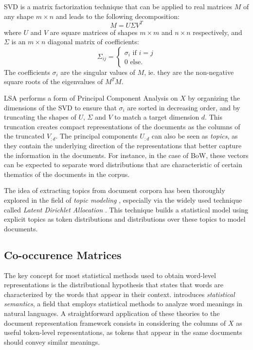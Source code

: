 SVD is a matrix factorization technique that can be applied to real matrices $M$ of any shape $m \times n$ and leads to the following decomposition:
$$
M = U \Sigma V^T
$$
where $U$ and $V$ are square matrices of shapes $m \times m$ and $n \times n$ respectively, and $\Sigma$ is an $m \times n$ diagonal matrix of coefficients:
\begin{equation*}
  \Sigma_{ij} = \begin{cases}
    \sigma_i \text{ if } i=j \\
    0 \text{ else.}
  \end{cases}
\end{equation*}
The coefficients $\sigma_i$ are the singular values of $M$, ie. they are the non-negative square roots of the eigenvalues of $M^TM$.

LSA performs a form of Principal Component Analysis on $X$ by organizing the dimensions of the SVD to ensure that $\sigma_i$ are sorted in decreasing order, and by truncating the shapes of $U$, $\Sigma$ and $V$ to match a target dimension $d$. This truncation creates compact representations of the documents as the columns of the truncated $V_{:d}$. The principal components $U_{:d}$ can also be seen as \textit{topics}, as they contain the underlying direction of the representations that better capture the information in the documents. For instance, in the case of BoW, these vectors can be expected to separate word distributions that are characteristic of certain thematics of the documents in the corpus.

The idea of extracting topics from document corpora has been thoroughly explored in the field of \textit{topic modeling} \citep{churchill2022evolution}, especially via the widely used technique called \textit{Latent Dirichlet Allocation} \citep{lda}. This technique builds a statistical model using explicit topics as token distributions and distributions over these topics to model documents.



\subsection{Co-occurence Matrices}

The key concept for most statistical methods used to obtain word-level representations is the distributional hypothesis \citep{harris1954distributional} that states that words are characterized by the words that appear in their context. \citep{weaver-1952-translation} introduces \textit{statistical semantics}, a field that employs statistical methods to analyze word meanings in natural languages. A straightforward application of these theories to the document representation framework consists in considering the columns of $X$ as useful token-level representations, as tokens that appear in the same documents should convey similar meanings.

